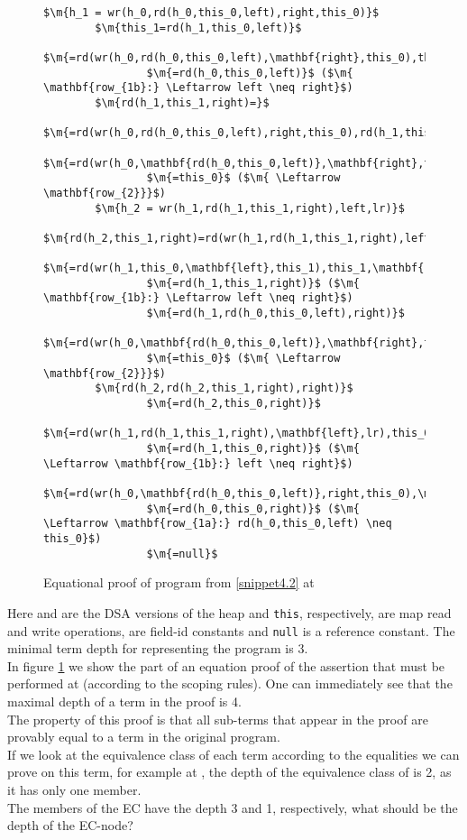 \begin{figure}
\begin{lstlisting}[tabsize=1]
		$\m{h_1 = wr(h_0,rd(h_0,this_0,left),right,this_0)}$
		$\m{this_1=rd(h_1,this_0,left)}$
				$\m{=rd(wr(h_0,rd(h_0,this_0,left),\mathbf{right},this_0),this_0,\mathbf{left})}$
				$\m{=rd(h_0,this_0,left)}$ ($\m{ \mathbf{row_{1b}:} \Leftarrow left \neq right}$)
		$\m{rd(h_1,this_1,right)=}$
				$\m{=rd(wr(h_0,rd(h_0,this_0,left),right,this_0),rd(h_1,this_0,left),right)}$
				$\m{=rd(wr(h_0,\mathbf{rd(h_0,this_0,left)},\mathbf{right},this_0),\mathbf{rd(h_0,this_0,left)},\mathbf{right})}$
				$\m{=this_0}$ ($\m{ \Leftarrow \mathbf{row_{2}}}$)
		$\m{h_2 = wr(h_1,rd(h_1,this_1,right),left,lr)}$
		$\m{rd(h_2,this_1,right)=rd(wr(h_1,rd(h_1,this_1,right),left,lr),this_1,right)}$
				$\m{=rd(wr(h_1,this_0,\mathbf{left},this_1),this_1,\mathbf{right})}$
				$\m{=rd(h_1,this_1,right)}$ ($\m{ \mathbf{row_{1b}:} \Leftarrow left \neq right}$)
				$\m{=rd(h_1,rd(h_0,this_0,left),right)}$ 
				$\m{=rd(wr(h_0,\mathbf{rd(h_0,this_0,left)},\mathbf{right},this_0),\mathbf{rd(h_0,this_0,left)},\mathbf{right})}$ 
				$\m{=this_0}$ ($\m{ \Leftarrow \mathbf{row_{2}}}$)
		$\m{rd(h_2,rd(h_2,this_1,right),right)}$
				$\m{=rd(h_2,this_0,right)}$
				$\m{=rd(wr(h_1,rd(h_1,this_1,right),\mathbf{left},lr),this_0,\mathbf{right}))}$
				$\m{=rd(h_1,this_0,right)}$ ($\m{ \Leftarrow \mathbf{row_{1b}:} left \neq right}$)
				$\m{=rd(wr(h_0,\mathbf{rd(h_0,this_0,left)},right,this_0),\mathbf{this_0},right))}$ 
				$\m{=rd(h_0,this_0,right)}$ ($\m{ \Leftarrow \mathbf{row_{1a}:} rd(h_0,this_0,left) \neq this_0}$)
				$\m{=null}$ 
\end{lstlisting}
\caption{Equational proof of program from \ref{snippet4.2} at}
\label{snippet4.2_proof}
\end{figure}

Here  and  are the DSA versions of the heap and \lstinline|this|, respectively,  are map read and write operations,  are field-id constants and \lstinline|null| is a reference constant.
The minimal term depth for representing the program is 3.\\
In figure \ref{snippet4.2_proof} we show the part of an equation proof of the assertion that must be performed at  (according to the scoping rules). One can immediately see that the maximal depth of a term in the proof is 4.\\
The property of this proof is that all sub-terms that appear in the proof are provably equal to a term in the original program. \\
If we look at the equivalence class of each term  according to the equalities we can prove on this term, for example at , the depth of the equivalence class of
 is 2, as it has only one member.\\
The members of the EC  have the depth 3 and 1, respectively, what should be the depth of the EC-node?

